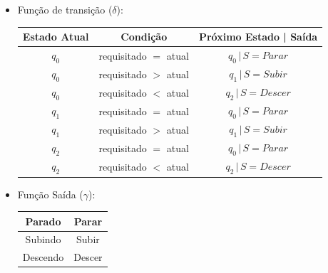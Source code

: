 \documentclass[a4paper,12pt]{article}
\begin{document}
        \begin{itemize}
            \item Função de transição ($\delta$):
                \begin{center}
                    \begin{tabular}{|c|c|c|}
                        \hline
                        Estado Atual & Condição & Próximo Estado | Saída \\
                        \hline
                        $q_0$ & requisitado $=$ atual & $q_0 \,|\, S = Parar$ \\
                        $q_0$ & requisitado $>$ atual & $q_1 \,|\, S = Subir$ \\
                        $q_0$ & requisitado $<$ atual & $q_2 \,|\, S = Descer$ \\
                        \hline
                        $q_1$ & requisitado $=$ atual & $q_0 \,|\, S = Parar$ \\
                        $q_1$ & requisitado $>$ atual & $q_1 \,|\, S = Subir$ \\
                        \hline
                        $q_2$ & requisitado $=$ atual & $q_0 \,|\, S = Parar$ \\
                        $q_2$ & requisitado $<$ atual & $q_2 \,|\, S = Descer$ \\
                        \hline  
                    \end{tabular}
                \end{center}
                
            \item Função Saída ($\gamma$):
            \begin{center}
                \begin{tabular}{|c|c|}
                    \hline
                    Parado & Parar\\
                    \hline
                    Subindo & Subir\\
                    \hline
                    Descendo & Descer\\
                    \hline
                \end{tabular}
            \end{center}
        \end{itemize}
\end{document}
